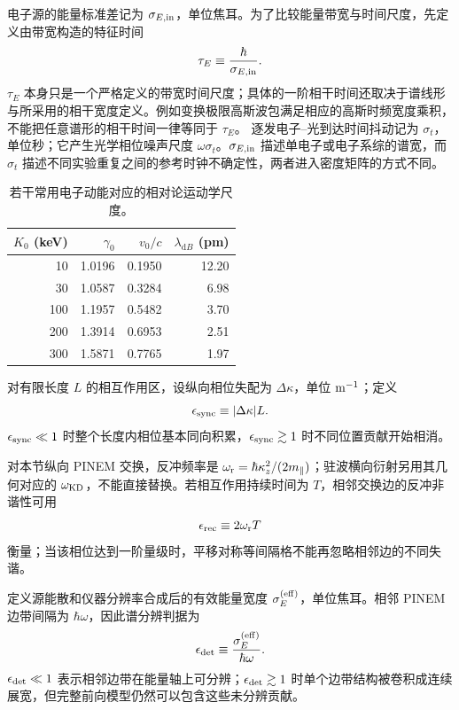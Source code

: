 电子源的能量标准差记为 $\sigma_{E,{\rm in}}$，单位焦耳。为了比较能量带宽与时间尺度，先定义由带宽构造的特征时间
\begin{equation*}
\tau_E\equiv\frac{\hbar}{\sigma_{E,{\rm in}}}.
\end{equation*}
$\tau_E$ 本身只是一个严格定义的带宽时间尺度；具体的一阶相干时间还取决于谱线形与所采用的相干宽度定义。例如变换极限高斯波包满足相应的高斯时频宽度乘积，不能把任意谱形的相干时间一律等同于 $\tau_E$。
逐发电子--光到达时间抖动记为 $\sigma_t$，单位秒；它产生光学相位噪声尺度 $\omega\sigma_t$。$\sigma_{E,{\rm in}}$ 描述单电子或电子系综的谱宽，而 $\sigma_t$ 描述不同实验重复之间的参考时钟不确定性，两者进入密度矩阵的方式不同。

\begin{table}[H]
\centering
\caption{若干常用电子动能对应的相对论运动学尺度。}
\label{tab:electron_kinematic_scales}
\begin{tabular}{rrrr}
\toprule
$K_0$ (keV) & $\gamma_0$ & $v_0/c$ & $\lambda_{\mathrm dB}$ (pm)\\
\midrule
10 & 1.0196 & 0.1950 & 12.20\\
30 & 1.0587 & 0.3284 & 6.98\\
100 & 1.1957 & 0.5482 & 3.70\\
200 & 1.3914 & 0.6953 & 2.51\\
300 & 1.5871 & 0.7765 & 1.97\\
\bottomrule
\end{tabular}
\end{table}

对有限长度 $L$ 的相互作用区，设纵向相位失配为 $\Delta\kappa$，单位 ${\rm m^{-1}}$；定义
\begin{equation*}
\epsilon_{\rm sync}\equiv|\Delta\kappa|L.
\end{equation*}
$\epsilon_{\rm sync}\ll1$ 时整个长度内相位基本同向积累，$\epsilon_{\rm sync}\gtrsim1$ 时不同位置贡献开始相消。

对本节纵向 PINEM 交换，反冲频率是 $\omega_{\rm r}=\hbar\kappa_z^2/(2m_\parallel)$；驻波横向衍射另用其几何对应的 $\omega_{\rm KD}$，不能直接替换。若相互作用持续时间为 $T$，相邻交换边的反冲非谐性可用
\begin{equation*}
\epsilon_{\rm rec}\equiv2\omega_{\rm r}T
\end{equation*}
衡量；当该相位达到一阶量级时，平移对称等间隔格不能再忽略相邻边的不同失谐。

定义源能散和仪器分辨率合成后的有效能量宽度 $\sigma_E^{({\rm eff})}$，单位焦耳。相邻 PINEM 边带间隔为 $\hbar\omega$，因此谱分辨判据为
\begin{equation*}
\epsilon_{\rm det}
\equiv\frac{\sigma_E^{({\rm eff})}}{\hbar\omega}.
\end{equation*}
$\epsilon_{\rm det}\ll1$ 表示相邻边带在能量轴上可分辨；$\epsilon_{\rm det}\gtrsim1$ 时单个边带结构被卷积成连续展宽，但完整前向模型仍然可以包含这些未分辨贡献。

